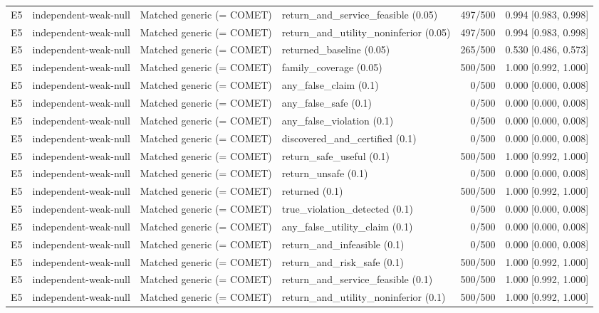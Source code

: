 \begin{longtable}{p{.04\linewidth}p{.18\linewidth}p{.19\linewidth}p{.16\linewidth}r p{.21\linewidth}}
E5 & independent-weak-null & Matched generic (= COMET) & return\_and\_service\_feasible (0.05) & 497/500 & 0.994 [0.983, 0.998]\\
E5 & independent-weak-null & Matched generic (= COMET) & return\_and\_utility\_noninferior (0.05) & 497/500 & 0.994 [0.983, 0.998]\\
E5 & independent-weak-null & Matched generic (= COMET) & returned\_baseline (0.05) & 265/500 & 0.530 [0.486, 0.573]\\
E5 & independent-weak-null & Matched generic (= COMET) & family\_coverage (0.05) & 500/500 & 1.000 [0.992, 1.000]\\
E5 & independent-weak-null & Matched generic (= COMET) & any\_false\_claim (0.1) & 0/500 & 0.000 [0.000, 0.008]\\
E5 & independent-weak-null & Matched generic (= COMET) & any\_false\_safe (0.1) & 0/500 & 0.000 [0.000, 0.008]\\
E5 & independent-weak-null & Matched generic (= COMET) & any\_false\_violation (0.1) & 0/500 & 0.000 [0.000, 0.008]\\
E5 & independent-weak-null & Matched generic (= COMET) & discovered\_and\_certified (0.1) & 0/500 & 0.000 [0.000, 0.008]\\
E5 & independent-weak-null & Matched generic (= COMET) & return\_safe\_useful (0.1) & 500/500 & 1.000 [0.992, 1.000]\\
E5 & independent-weak-null & Matched generic (= COMET) & return\_unsafe (0.1) & 0/500 & 0.000 [0.000, 0.008]\\
E5 & independent-weak-null & Matched generic (= COMET) & returned (0.1) & 500/500 & 1.000 [0.992, 1.000]\\
E5 & independent-weak-null & Matched generic (= COMET) & true\_violation\_detected (0.1) & 0/500 & 0.000 [0.000, 0.008]\\
E5 & independent-weak-null & Matched generic (= COMET) & any\_false\_utility\_claim (0.1) & 0/500 & 0.000 [0.000, 0.008]\\
E5 & independent-weak-null & Matched generic (= COMET) & return\_and\_infeasible (0.1) & 0/500 & 0.000 [0.000, 0.008]\\
E5 & independent-weak-null & Matched generic (= COMET) & return\_and\_risk\_safe (0.1) & 500/500 & 1.000 [0.992, 1.000]\\
E5 & independent-weak-null & Matched generic (= COMET) & return\_and\_service\_feasible (0.1) & 500/500 & 1.000 [0.992, 1.000]\\
E5 & independent-weak-null & Matched generic (= COMET) & return\_and\_utility\_noninferior (0.1) & 500/500 & 1.000 [0.992, 1.000]\\

\end{longtable}
